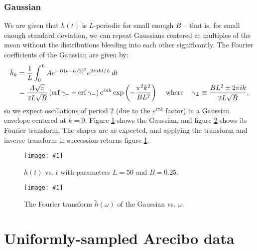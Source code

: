 \documentclass{article}
\theoremstyle{definition}
\renewcommand{\sp}[1]{\;\;\;\text{ #1 }\;\;\;}
\newcommand{\plop}[2]{
    \begin{figure}\centering
        \texttt{[image: \#1]}
        \caption{\label{#1}#2}
    \end{figure}
}
\begin{document}
\subsubsection{Gaussian}

We are given that $h(t)$ is $L$-periodic for small enough $B$ -- that is,
for small enough standard deviation, we can repeat Gaussians
centered at multiples of the mean without the distributions bleeding into
each other significantly. The Fourier coefficients of the Gaussian
are given by:
\begin{align*}
\tilde h_k &= {1 \over L} \int_0^L A e^{-B (t - L/2)^2}
e^{2\pi i k t / L} \, dt \\
&=
{A\sqrt\pi \over 2L \sqrt B}
\left(
    \erf \gamma_+ + \erf \gamma_-
\right)
e^{i\pi k}
\exp\left(
    -{\pi^2 k^2 \over B L^2}
\right)
\sp{where}
\gamma_{\pm} \equiv {BL^2 \pm 2\pi i k \over 2L \sqrt B},
\end{align*}
so we expect oscillations of period 2 (due to the $e^{i\pi k}$ factor)
in a Gaussian envelope centered at $k = 0$.
Figure \ref{h.pdf} shows the Gaussian, and figure \ref{Fh.pdf} shows
its Fourier transform. The shapes are as expected, and applying the transform
and inverse transform in succession returns figure \ref{h.pdf}.
\plop{h.pdf}{$h(t)$ vs. $t$ with parameters $L = 50$ and $B = 0.25$.}
\plop{Fh.pdf}{The Fourier transform $\tilde h(\omega)$ of the Gaussian
vs. $\omega$.}

\section{Uniformly-sampled Arecibo data}
\end{document}
